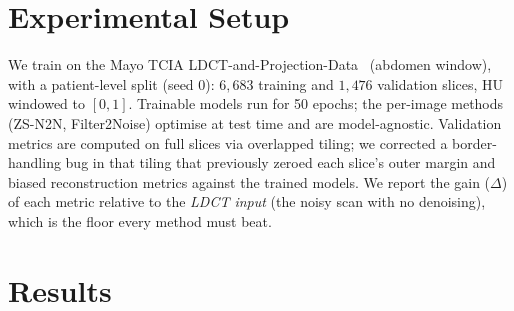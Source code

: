 \documentclass[10pt,twocolumn]{article}
\begin{document}
\section{Experimental Setup}
We train on the Mayo TCIA LDCT-and-Projection-Data~\cite{moen2021low}
(abdomen window), with a patient-level split (seed 0): $6{,}683$ training
and $1{,}476$ validation slices, HU windowed to $[0,1]$.  Trainable models
run for 50 epochs; the per-image methods (ZS-N2N, Filter2Noise) optimise at
test time and are model-agnostic.  Validation metrics are computed on full
slices via overlapped tiling; we corrected a border-handling bug in that
tiling that previously zeroed each slice's outer margin and biased
reconstruction metrics against the trained models.  We report the gain
($\Delta$) of each metric relative to the \emph{LDCT input} (the noisy scan
with no denoising), which is the floor every method must beat.

\section{Results}
\end{document}

